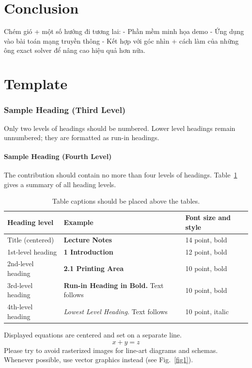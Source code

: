\documentclass[runningheads]{llncs}
\begin{document}
\section{Conclusion}
Chém gió + một số hướng đi tương lai:
- Phần mềm minh họa demo
- Ứng dụng vào bài toán mạng truyền thông
- Kết hợp với góc nhìn + cách làm của những ông exact solver để nâng cao hiệu quả hơn nữa.

\section{Template}
\subsubsection{Sample Heading (Third Level)} Only two levels of
headings should be numbered. Lower level headings remain unnumbered;
they are formatted as run-in headings.

\paragraph{Sample Heading (Fourth Level)}
The contribution should contain no more than four levels of
headings. Table~\ref{tab1} gives a summary of all heading levels.

\begin{table}
\caption{Table captions should be placed above the
tables.}\label{tab1}
\begin{tabular}{|l|l|l|}
\hline
Heading level &  Example & Font size and style\\
\hline
Title (centered) &  {\Large\bfseries Lecture Notes} & 14 point, bold\\
1st-level heading &  {\large\bfseries 1 Introduction} & 12 point, bold\\
2nd-level heading & {\bfseries 2.1 Printing Area} & 10 point, bold\\
3rd-level heading & {\bfseries Run-in Heading in Bold.} Text follows & 10 point, bold\\
4th-level heading & {\itshape Lowest Level Heading.} Text follows & 10 point, italic\\
\hline
\end{tabular}
\end{table}


\noindent Displayed equations are centered and set on a separate
line.
\begin{equation}
x + y = z
\end{equation}
Please try to avoid rasterized images for line-art diagrams and
schemas. Whenever possible, use vector graphics instead (see
Fig.~\ref{fig1}).
\end{document}

